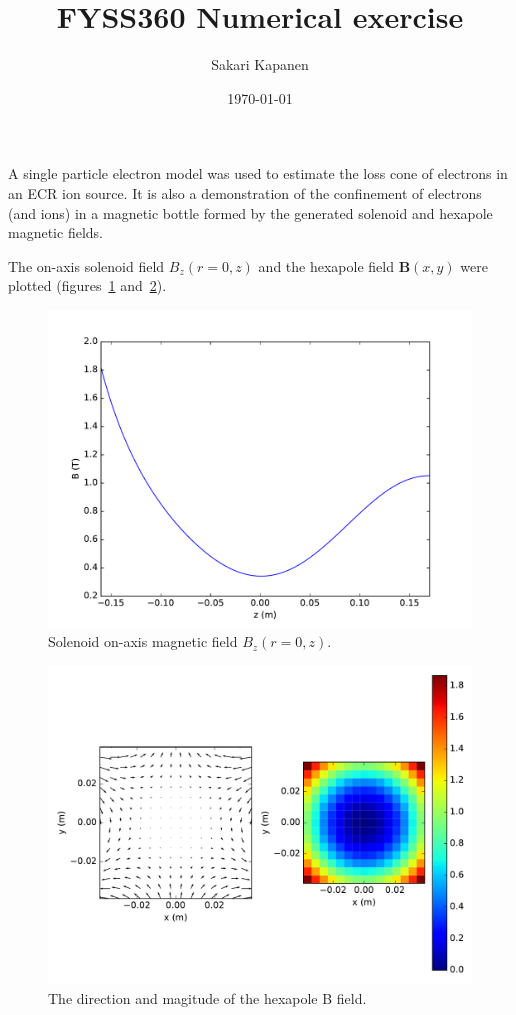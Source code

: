 \documentclass[11pt, a4paper]{article}
\begin{document}
\title{FYSS360 Numerical exercise}
\author{Sakari Kapanen}
\date{\today}
\maketitle

A single particle electron model was used to estimate the loss cone of electrons in an ECR ion source. It is also a demonstration of the confinement of electrons (and ions) in a magnetic bottle formed by the generated solenoid and hexapole magnetic fields.

The on-axis solenoid field $B_z(r=0, z)$ and the hexapole field $\mathbf{B}(x, y)$ were plotted (figures~\ref{fig:solenoidb} and~\ref{fig:hexapoleb}).
\begin{figure}
    \centering
    \includegraphics[width=\textwidth]{output/solenoid_B_onaxis.pdf}
    \caption{Solenoid on-axis magnetic field $B_z(r=0, z)$.}
    \label{fig:solenoidb}
\end{figure}
\begin{figure}
    \centering
    \includegraphics[width=\textwidth]{output/hexapole_B.pdf}
    \caption{The direction and magitude of the hexapole B field.}
    \label{fig:hexapoleb}
\end{figure}
\end{document}
